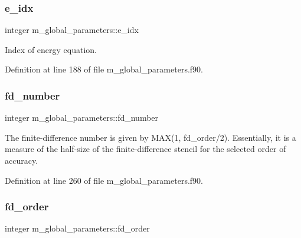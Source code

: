 \mbox{\label{namespacem__global__parameters_ac6ef72ca6aa7a22e60c864df25559892}} 
\subsubsection{\texorpdfstring{e\+\_\+idx}{e\_idx}}
{\footnotesize\ttfamily integer m\+\_\+global\+\_\+parameters\+::e\+\_\+idx}



Index of energy equation. 



Definition at line 188 of file m\+\_\+global\+\_\+parameters.\+f90.

\mbox{\label{namespacem__global__parameters_a60d7ab72fdab2b005144a5a45aa572de}} 
\subsubsection{\texorpdfstring{fd\+\_\+number}{fd\_number}}
{\footnotesize\ttfamily integer m\+\_\+global\+\_\+parameters\+::fd\+\_\+number}



The finite-\/difference number is given by M\+AX(1, fd\+\_\+order/2). Essentially, it is a measure of the half-\/size of the finite-\/difference stencil for the selected order of accuracy. 



Definition at line 260 of file m\+\_\+global\+\_\+parameters.\+f90.

\mbox{\label{namespacem__global__parameters_a8892cc67c7d04be4d8e6d02a86e209bc}} 
\subsubsection{\texorpdfstring{fd\+\_\+order}{fd\_order}}
{\footnotesize\ttfamily integer m\+\_\+global\+\_\+parameters\+::fd\+\_\+order}



